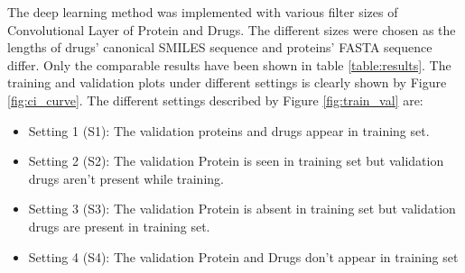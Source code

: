 The deep learning method was implemented with various filter sizes of Convolutional Layer of Protein and Drugs. The different sizes were chosen as the lengths of drugs' canonical SMILES sequence and proteins' FASTA sequence differ. Only the comparable results have been shown in table \ref{table:results}. The training and validation plots under different settings is clearly shown by Figure \ref{fig:ci_curve}. The different settings described by Figure \ref{fig:train_val} are:
\begin{itemize}
    \item Setting 1 (S1): The validation proteins and drugs appear in training set.
    \item Setting 2 (S2): The validation Protein is seen in training set but validation drugs aren't present while training.
    \item Setting 3 (S3): The validation Protein is absent in training set but validation drugs are present in training set.
    \item Setting 4 (S4): The validation Protein and Drugs don't appear in training set
\end{itemize}

